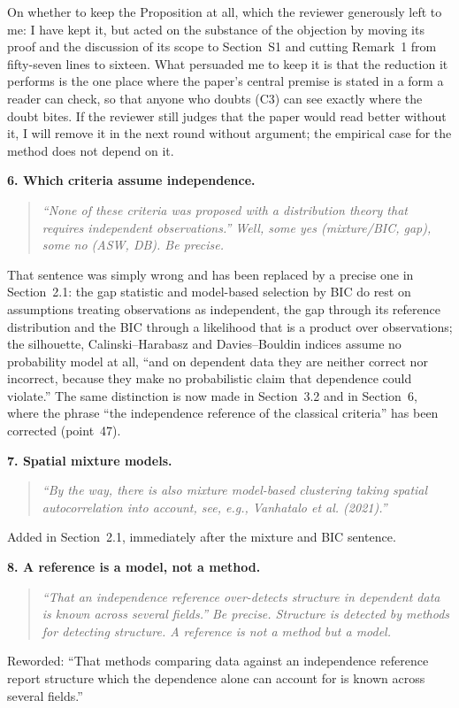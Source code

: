 \documentclass[11pt]{article}
\newcommand{\R}[1]{\medskip\noindent\textbf{#1}\quad}
\newenvironment{rquote}{\begin{quote}\itshape}{\end{quote}}
\begin{document}
On whether to keep the Proposition at all, which the reviewer generously left
to me: I have kept it, but acted on the substance of the objection by moving
its proof and the discussion of its scope to Section~S1 and cutting Remark~1
from fifty-seven lines to sixteen. What persuaded me to keep it is that the
reduction it performs is the one place where the paper's central premise is
stated in a form a reader can check, so that anyone who doubts (C3) can see
exactly where the doubt bites. If the reviewer still judges that the paper
would read better without it, I will remove it in the next round without
argument; the empirical case for the method does not depend on it.

\R{6. Which criteria assume independence.}
\begin{rquote}
``None of these criteria was proposed with a distribution theory that requires
independent observations.'' Well, some yes (mixture/BIC, gap), some no (ASW,
DB). Be precise.
\end{rquote}
That sentence was simply wrong and has been replaced by a precise one in
Section~2.1: the gap statistic and model-based selection by BIC do rest on
assumptions treating observations as independent, the gap through its reference
distribution and the BIC through a likelihood that is a product over
observations; the silhouette, Calinski--Harabasz and Davies--Bouldin indices
assume no probability model at all, ``and on dependent data they are neither
correct nor incorrect, because they make no probabilistic claim that dependence
could violate.'' The same distinction is now made in Section~3.2 and in
Section~6, where the phrase ``the independence reference of the classical
criteria'' has been corrected (point~47).

\R{7. Spatial mixture models.}
\begin{rquote}
``By the way, there is also mixture model-based clustering taking spatial
autocorrelation into account, see, e.g., Vanhatalo et al. (2021).''
\end{rquote}
Added in Section~2.1, immediately after the mixture and BIC sentence.

\R{8. A reference is a model, not a method.}
\begin{rquote}
``That an independence reference over-detects structure in dependent data is
known across several fields.'' Be precise. Structure is detected by methods for
detecting structure. A reference is not a method but a model.
\end{rquote}
Reworded: ``That methods comparing data against an independence reference
report structure which the dependence alone can account for is known across
several fields.''
\end{document}

